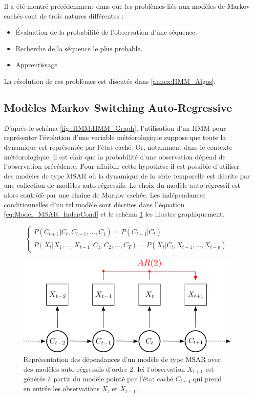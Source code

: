\documentclass[12pt, french]{report}
\begin{document}
Il a été montré précédemment dans \cite{rabiner_tutorial_1989} que les problèmes liés aux modèles de Markov cachés sont de trois natures différentes : 
\begin{itemize}
	\item Évaluation de la probabilité de l’observation d’une séquence.
	\item Recherche de la séquence le plus probable.
	\item Apprentissage
\end{itemize}

La résolution de ces problèmes est discutée dans \ref{annex:HMM_Algos}.


\subsection{Modèles Markov Switching Auto-Regressive}
\label{subsec:Modeles_MSAR}
D'après le schéma \ref{fig::HMM:HMM_Graph}, l'utilisation d'un HMM pour représenter l'évolution d'une variable météorologique suppose que toute la dynamique est représentée par l'état caché. Or, notamment dans le contexte météorologique, il est clair que la probabilité d'une observation dépend de l'observation précédente. Pour affaiblir cette hypothèse il est possible d'utiliser des modèles de type MSAR où la dynamique de la série temporelle est décrite par une collection de modèles auto-régressifs. Le choix du modèle auto-régressif est alors contrôlé par une chaîne de Markov cachée. Les indépendances conditionnelles d'un tel modèle sont décrites dans l'équation \eqref{eq:Model_MSAR_IndepCond} et le schéma \ref{fig::HMM:MSAR} les illustre graphiquement.

\begin{equation}
\begin{cases}
P\left( C_{t+1} | C_t,C_{t-1},...,C_1  \right) = P\left( C_{t+1} | C_t  \right) \\
P\left( X_t | X_1,...,X_{t-1} , C_1,C_2,...,C_T \right)   = P(X_t | C_t, X_{t-1},...,X_{t-p})
\end{cases}
\label{eq:Model_MSAR_IndepCond}
\end{equation}


\begin{figure}[htbp]
	\begin{center}
		\includegraphics[width=0.6 \textwidth]{Images/Models/HMM/MSAR.png}
		\caption{Représentation des dépendances d'un modèle de type MSAR avec des modèles auto-régressifs d'ordre 2. Ici l'observation $X_{t+1}$ est générée à partir du modèle pointé par l'état caché $C_{t+1}$ qui prend en entrée les observations $X_t$ et $X_{t-1}$.}
		\label{fig::HMM:MSAR}
	\end{center}
\end{figure}
\end{document}

